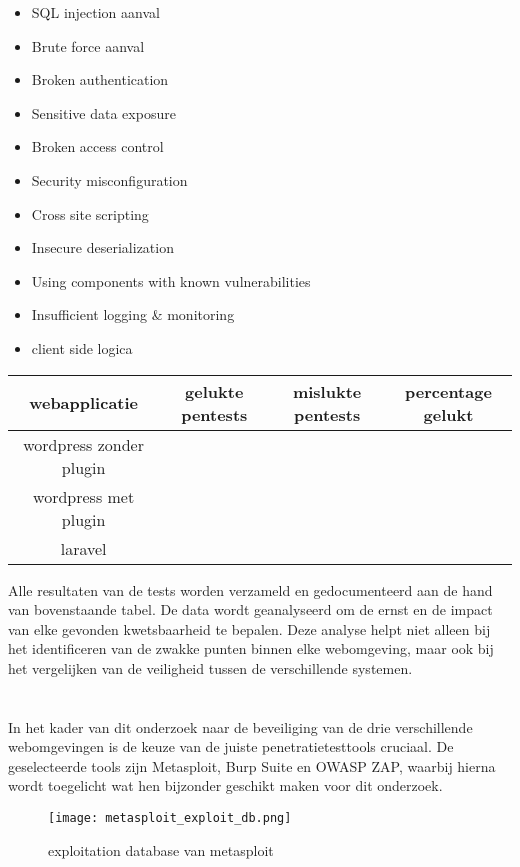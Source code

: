 \begin{itemize}
    \item SQL injection aanval
    \item Brute force aanval
    \item Broken authentication
    \item Sensitive data exposure
    \item Broken access control
    \item Security misconfiguration
    \item Cross site scripting
    \item Insecure deserialization
    \item Using components with known vulnerabilities
    \item Insufficient logging \& monitoring 
    \item client side logica
\end{itemize}

\begin{tabular}{ | c | c | c | c |}
    \hline			
    webapplicatie & gelukte pentests & mislukte pentests & percentage gelukt \\
    \hline  
    wordpress zonder plugin & & & \\
    wordpress met plugin & & & \\
    laravel &  &  & \\
\end{tabular}
Alle resultaten van de tests worden verzameld en gedocumenteerd aan de hand van bovenstaande tabel. De data wordt geanalyseerd 
om de ernst en de impact van elke gevonden kwetsbaarheid te bepalen. Deze analyse helpt niet alleen bij 
het identificeren van de zwakke punten binnen elke webomgeving, maar ook bij het vergelijken van de 
veiligheid tussen de verschillende systemen.

\section{}
In het kader van dit onderzoek naar de beveiliging van de drie verschillende webomgevingen is de keuze van 
de juiste penetratietesttools cruciaal. De geselecteerde tools zijn 
Metasploit, Burp Suite en OWASP ZAP, waarbij hierna wordt toegelicht wat hen bijzonder geschikt maken voor dit onderzoek.
\begin{figure}
    \centering
    \texttt{[image: metasploit\_exploit\_db.png]}
    \caption[exploitation database van metasploit]{exploitation database van metasploit}
\end{figure}
